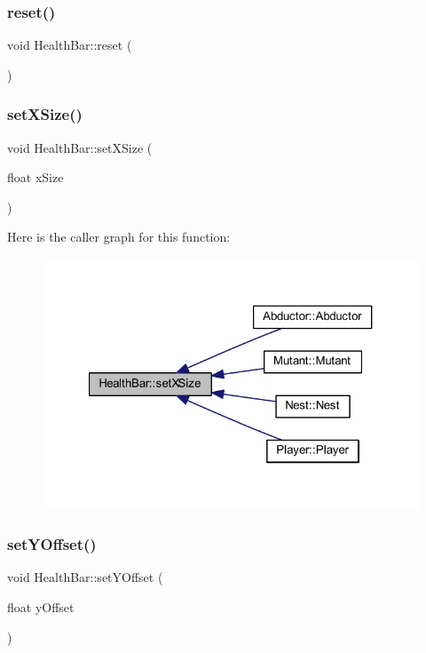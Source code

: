 \subsubsection{\texorpdfstring{reset()}{reset()}}
{\footnotesize\ttfamily void Health\+Bar\+::reset (\begin{DoxyParamCaption}{ }\end{DoxyParamCaption})}

\mbox{\label{class_health_bar_a161a9325d1bddd74fd13665ad12c979a}} 
\subsubsection{\texorpdfstring{set\+X\+Size()}{setXSize()}}
{\footnotesize\ttfamily void Health\+Bar\+::set\+X\+Size (\begin{DoxyParamCaption}\item[{float}]{x\+Size }\end{DoxyParamCaption})}

Here is the caller graph for this function\+:
\nopagebreak
\begin{figure}[H]
\begin{center}
\leavevmode
\includegraphics[width=321pt]{class_health_bar_a161a9325d1bddd74fd13665ad12c979a_icgraph}
\end{center}
\end{figure}
\mbox{\label{class_health_bar_a625701fd387910d769905ebd1a0f41a4}} 
\subsubsection{\texorpdfstring{set\+Y\+Offset()}{setYOffset()}}
{\footnotesize\ttfamily void Health\+Bar\+::set\+Y\+Offset (\begin{DoxyParamCaption}\item[{float}]{y\+Offset }\end{DoxyParamCaption})}

